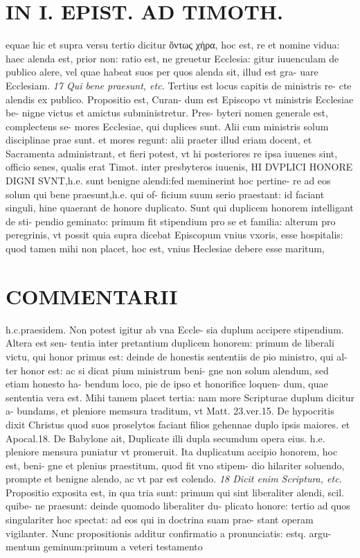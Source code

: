 \documentclass{article}
\begin{document}
\begin{pages}
\section*{IN I. EPIST. AD TIMOTH. }
\marginpar{[ p.131 ]}\pstart equae hic et supra versu tertio dicitur ὄντως χήρα, hoc est, re et nomine vidua: haec alenda est, prior non: ratio est, ne greuetur Ecclesia: gitur iuuenculam de publico alere, vel quae habeat suos per quos alenda sit, illud est gra- uare Ecclesiam.  \pend
\textit{17 Qui bene praesunt, etc. }\pstart Tertius est locus capitis de ministris re- cte alendis ex publico. Propositio est, Curan- dum est Episcopo vt ministris Ecclesiae be- nigne victus et amictus subministretur. Pres- byteri nomen generale est, complectens se- mores Ecclesiae, qui duplices sunt.  \pend\pstart Alii cum ministris solum disciplinae prae sunt. et mores regunt: alii praeter illud eriam docent, et Sacramenta administrant, et fieri potest, vt hi posteriores re ipsa iuuenes sint, officio senes, qualis erat Timot. inter presbyteros iuuenis, HI DVPLICI HONORE DIGNI SVNT,h.e. sunt benigne alendi:fed meminerint hoc pertine- re ad eos solum qui bene praesunt,h.e. qui of- ficium suum serio praestant: id faciant singuli, hine quaerant de honore duplicato.  \pend\pstart Sunt qui duplicem honorem intelligant de sti- pendio geminato: primum fit stipendium pro se et familia: alterum pro peregrinis, vt possit quia supra dicebat Episcopum vnius vxoris, esse hospitalis: quod tamen mihi non placet, hoc est, vnius Heclesiae debere esse maritum,  \pend
\marginpar{[ p.132 ]}
\section*{COMMENTARII }\pstart h.c.praesidem. Non potest igitur ab vna Eccle- sia duplum accipere stipendium. Altera est sen- tentia inter pretantium duplicem honorem: primum de liberali victu, qui honor primus est: deinde de honestis sententiis de pio ministro, qui al- ter honor est: ac si dicat pium ministrum beni- gne non solum alendum, sed etiam honesto ha- bendum loco, pie de ipso et honorifice loquen- dum, quae sententia vera est. Mihi tamem placet tertia: nam more Scripturae duplum dicitur a- bundams, et pleniore memsura traditum, vt Matt. 23.ver.15. De hypocritis dixit Christus quod suos proselytos faciant filios gehennae duplo ipsis maiores. et Apocal.18. De Babylone ait, Duplicate illi dupla secumdum opera eius. h.e. pleniore mensura puniatur vt promeruit. Ita duplicatum accipio honorem, hoc est, beni- gne et plenius praestitum, quod fit vno stipem- dio hilariter soluendo, prompte et benigne alendo, ac vt par est colendo.  \pend
\textit{18 Dicit enim Scriptura, etc. }\pstart Propositio exposita est, in qua tria sunt: primum qui sint liberaliter alendi, scil. quibe- ne praesunt: deinde quomodo liberaliter du- plicato honore: tertio ad quos singulariter hoc spectat: ad eos qui in doctrina suam prae- stant operam vigilanter. Nunc propositionis additur confirmatio a pronunciatis: estq. argu- mentum geminum:primum a veteri testamento  \pend

\end{pages}
\end{document}
